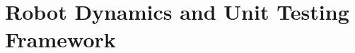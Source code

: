 \documentclass[runningheads]{llncs}
\begin{document}
\section{Robot Dynamics and Unit Testing Framework}
\label{sec:fundamentals_testing}


\end{document}
